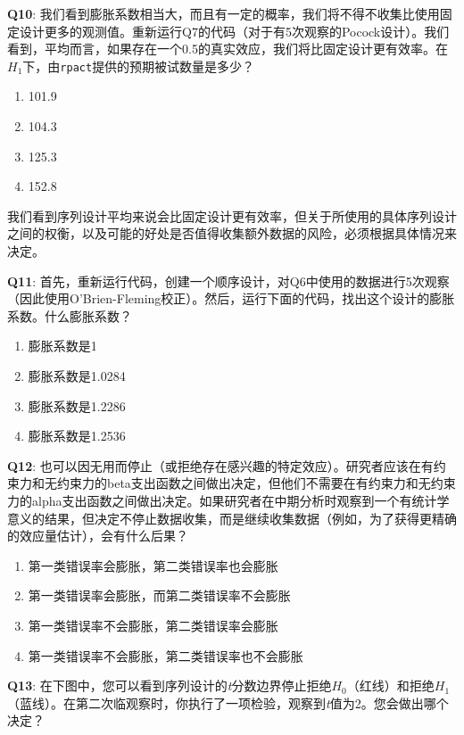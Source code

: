 \documentclass[
  letterpaper,
  DIV=11,
  numbers=noendperiod]{scrreprt}
\providecommand{\tightlist}{%
  \setlength{\itemsep}{0pt}\setlength{\parskip}{0pt}}\usepackage{longtable,booktabs,array}
\begin{document}
\textbf{Q10}:
我们看到膨胀系数相当大，而且有一定的概率，我们将不得不收集比使用固定设计更多的观测值。重新运行Q7的代码（对于有5次观察的Pocock设计）。我们看到，平均而言，如果存在一个0.5的真实效应，我们将比固定设计更有效率。在\(H_1\)下，由\texttt{rpact}提供的预期被试数量是多少？

\begin{enumerate}
\def\labelenumi{\Alph{enumi})}
\tightlist
\item
  101.9
\item
  104.3
\item
  125.3
\item
  152.8
\end{enumerate}

我们看到序列设计平均来说会比固定设计更有效率，但关于所使用的具体序列设计之间的权衡，以及可能的好处是否值得收集额外数据的风险，必须根据具体情况来决定。

\textbf{Q11}:
首先，重新运行代码，创建一个顺序设计，对Q6中使用的数据进行5次观察（因此使用O'Brien-Fleming校正）。然后，运行下面的代码，找出这个设计的膨胀系数。什么膨胀系数？

\begin{enumerate}
\def\labelenumi{\Alph{enumi})}
\tightlist
\item
  膨胀系数是1
\item
  膨胀系数是1.0284
\item
  膨胀系数是1.2286
\item
  膨胀系数是1.2536
\end{enumerate}

\textbf{Q12}:
也可以因无用而停止（或拒绝存在感兴趣的特定效应）。研究者应该在有约束力和无约束力的beta支出函数之间做出决定，但他们不需要在有约束力和无约束力的alpha支出函数之间做出决定。如果研究者在中期分析时观察到一个有统计学意义的结果，但决定不停止数据收集，而是继续收集数据（例如，为了获得更精确的效应量估计），会有什么后果？

\begin{enumerate}
\def\labelenumi{\Alph{enumi})}
\tightlist
\item
  第一类错误率会膨胀，第二类错误率也会膨胀
\item
  第一类错误率会膨胀，而第二类错误率不会膨胀
\item
  第一类错误率不会膨胀，第二类错误率会膨胀
\item
  第一类错误率不会膨胀，第二类错误率也不会膨胀
\end{enumerate}

\textbf{Q13}:
在下图中，您可以看到序列设计的\emph{t}分数边界停止拒绝\(H_0\)（红线）和拒绝\(H_1\)（蓝线）。在第二次临观察时，你执行了一项检验，观察到\emph{t}值为2。您会做出哪个决定？
\end{document}
